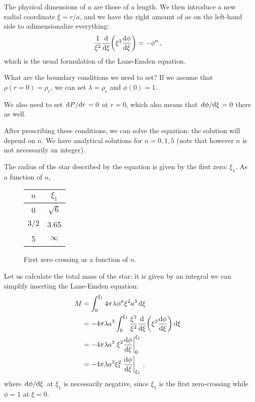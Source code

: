\documentclass[main.tex]{subfiles}
\begin{document}
The physical dimensions of \(a\) are those of a length. 
We then introduce a new radial coordinate \(\xi = r /a\), and we have the right amount of \(a\)s on the left-hand side to adimensionalize everything: 
%
\begin{align}
\frac{1}{\xi^2} \dv{}{\xi } \qty(\xi^2 \dv{\phi }{\xi }) = - \phi^{n}
\,,
\end{align}
%
which is the usual formulation of the Lane-Emden equation. 

What are the boundary conditions we need to set? If we assume that \(\rho (r=0) = \rho _c\), we can set \(\lambda = \rho _c\) and \(\phi (0) = 1\).

We also need to set \(\dv*{P}{r} = 0\) at \(r = 0\), which also means that \(\dv*{\phi }{\xi } =0 \) there as well. 


After prescribing these conditions, we can solve the equation: the solution will depend on \(n\). 
We have analytical solutions for \(n = 0, 1, 5\) (note that however \(n\) is not necessarily an integer). 

The radius of the star described by the equation is given by the first zero: \(\xi_1 \). 
As a function of \(n\), 

\begin{figure}
\centering
\begin{tabular}{cc}
\(n\) & \(\xi_1\)\\
\hline
0 & \(\sqrt{6}\)  \\
\(3/2\) & \num{3.65}  \\
5 & \(\infty \)
\end{tabular}
\label{tab:zero-crossing-lane-emden}
\caption{First zero crossing as a function of \(n\).}
\end{figure}

Let us calculate the total mass of the star: it is given by an integral we can simplify inserting the Lane-Emden equation:
%
\begin{align}
M &= \int_{0}^{\xi_1 } 4 \pi \lambda \phi^{n} \xi^2 a^3 \dd{\xi }  \\
&= -4 \pi \lambda a^3 \int_{0}^{\xi_1 } \frac{\xi^2}{\xi^2} \dv{}{\xi } \qty( \xi^2 \dv{\phi }{\xi }) \dd{\xi }  \\
&= - 4 \pi \lambda a^3 \eval{\xi^2 \dv{\phi }{\xi }}_{0}^{\xi_1 }  \\
&= - 4 \pi \lambda a^3 \xi_1^2 \eval{\dv{\phi }{\xi }}_{\xi_1 }
\,,
\end{align}
%
where \(\dv*{\phi }{\xi}\) at \(\xi_1 \) is necessarily negative, since \(\xi_1\) is the first zero-crossing while \(\phi = 1\) at \(\xi= 0\). 
\end{document}
